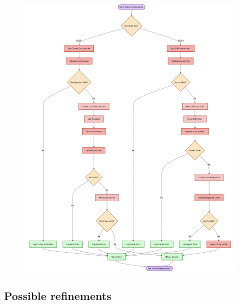 \begin{figure}[htbp]
    \centering
    \includegraphics[width=0.8\linewidth]{Flowcharts/json.png}

\end{figure}

\newpage

\subsection{Possible refinements}


